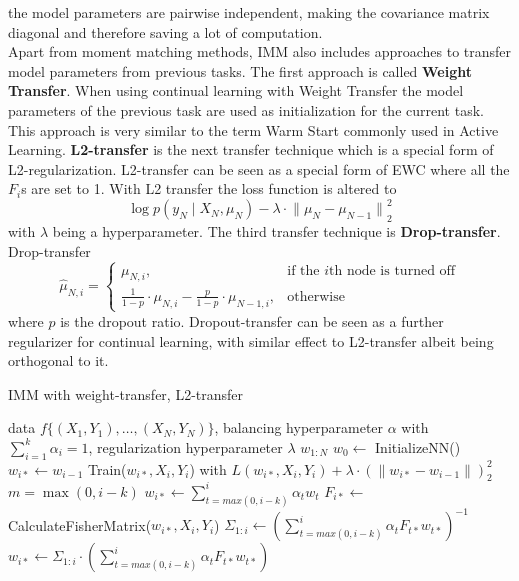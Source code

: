 the model parameters are pairwise independent, making the covariance matrix diagonal and therefore saving a lot of computation. \\ 
Apart from moment matching methods, IMM also includes approaches to transfer model parameters from previous tasks. The first approach is called
\textbf{Weight Transfer}. When using continual learning with Weight Transfer the model parameters of the previous task are used as initialization for the
current task. This approach is very similar to the term Warm Start commonly used in Active Learning. \textbf{L2-transfer} is the next transfer technique
which is a special form of L2-regularization. L2-transfer can be seen as a special form of EWC where all the $F_i$s are set to 1. With L2 transfer the loss
function is altered to 
\begin{equation}
    \log p(y_N \mid X_N, \mu_N) - \lambda \cdot {\lVert \mu_N - \mu_{N-1} \rVert}^2_2
\end{equation}
with $\lambda$ being a hyperparameter. The third transfer technique is \textbf{Drop-transfer}. Drop-transfer
\begin{equation}
    \hat{\mu}_{N,i} = \begin{cases} \mu_{N,i}, & \text{if the }i \text{th node is turned off} \\
    \frac{1}{1-p} \cdot \mu_{N,i} - \frac{p}{1-p} \cdot \mu_{N-1,i}, & \text{otherwise}  \end{cases}
\end{equation}
where $p$ is the dropout ratio. Dropout-transfer can be seen as a further regularizer for continual learning, with similar effect to L2-transfer albeit
being orthogonal to it.
\begin{algorithm}
    \caption{IMM with weight-transfer, L2-transfer} \label{alg:IMM}
    \begin{algorithmic}
        \Require data $f\{ (X_1,Y_1),\ldots,(X_N,Y_N)\}$, balancing hyperparameter $\alpha$ with $\sum_{i=1}^k \alpha_i = 1$,
        regularization hyperparameter $\lambda$
        \return $w_{1:N}$
        \State $w_0 \leftarrow $ InitializeNN()
            \State $w_{i*} \leftarrow w_{i-1}$
            \State Train($w_{i*},X_i,Y_i$) with $L(w_{i*},X_i,Y_i) + \lambda \cdot (\lVert w_{i*} - w_{i-1} \rVert)^2_2$
            \State $m=\max (0,i-k)$
            \State $w_{i*} \leftarrow \sum_{t=max(0,i-k)}^i \alpha_t w_{t}$
            \State $F_{i*} \leftarrow$ CalculateFisherMatrix($w_{i*},X_i,Y_i$)
            \State $\Sigma_{1:i} \leftarrow (\sum_{t=max(0,i-k)}^i \alpha_t F_{t*} w_{t*})^{-1}$
            \State $w_{i*} \leftarrow \Sigma_{1:i} \cdot (\sum_{t=max(0,i-k)}^i \alpha_t F_{t*} w_{t*})$
            \EndIf
        \EndFor
    \end{algorithmic}
\end{algorithm}


